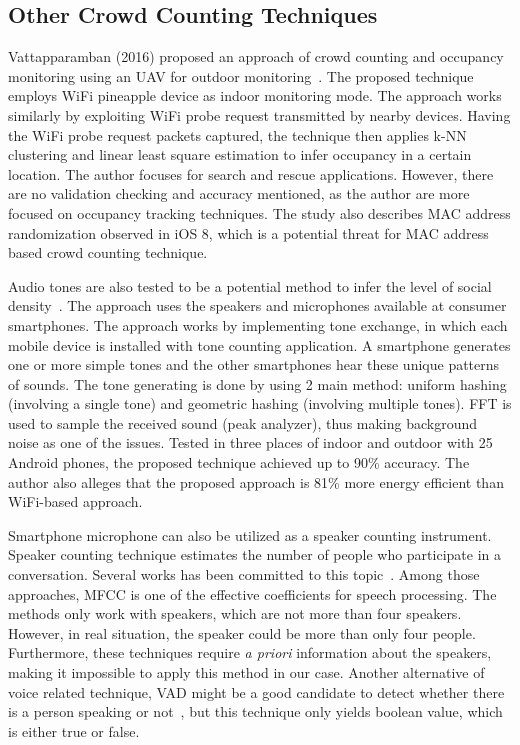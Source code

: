 	\subsection{Other Crowd Counting Techniques} %
	\label{sub:other_crowd_counting_techniques}
	Vattapparamban (2016) proposed an approach of crowd counting and occupancy monitoring using an \ac{UAV} for outdoor monitoring~\cite{thesis053}. The proposed technique employs WiFi pineapple device as indoor monitoring mode. The approach works similarly by exploiting WiFi probe request transmitted by nearby devices. Having the WiFi probe request packets captured, the technique then applies \ac{k-NN} clustering and linear least square estimation to infer occupancy in a certain location. The author focuses for search and rescue applications. However, there are no validation checking and accuracy mentioned, as the author are more focused on occupancy tracking techniques. The study also describes \ac{MAC} address randomization observed in iOS 8, which is a potential threat for \ac{MAC} address based crowd counting technique.

	Audio tones are also tested to be a potential method to infer the level of social density~\cite{thesis044}. The approach uses the speakers and microphones available at consumer smartphones. The approach works by implementing tone exchange, in which each mobile device is installed with tone counting application. A smartphone generates one or more simple tones and the other smartphones hear these unique patterns of sounds. The tone generating is done by using 2 main method: uniform hashing (involving a single tone) and geometric hashing (involving multiple tones). \ac{FFT} is used to sample the received sound (peak analyzer), thus making background noise as one of the issues. Tested in three places of indoor and outdoor with 25 Android phones, the proposed technique achieved up to 90\% accuracy. The author also alleges that the proposed approach is 81\% more energy efficient than WiFi-based approach.

	Smartphone microphone can also be utilized as a speaker counting instrument. Speaker counting technique estimates the number of people who participate in a conversation. Several works has been committed to this topic~\cite{thesis067,thesis074,thesis071}. Among those approaches, \ac{MFCC} is one of the effective coefficients for speech processing. The methods only work with speakers, which are not more than four speakers. However, in real situation, the speaker could be more than only four people. Furthermore, these techniques require \textit{a priori} information about the speakers, making it impossible to apply this method in our case. Another alternative of voice related technique, VAD might be a good candidate to detect whether there is a person speaking or not~\cite{thesis070}, but this technique only yields boolean value, which is either true or false.
	
